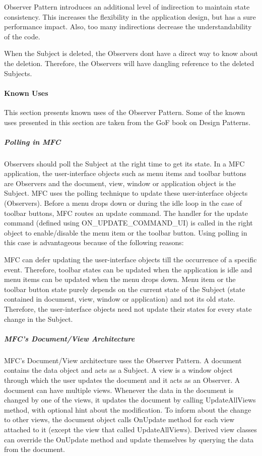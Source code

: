 \documentclass{book}
\begin{document}
    Observer Pattern introduces an additional level of indirection to maintain state consistency. This increases the flexibility in the application design, but has a sure performance impact.
    Also, too many indirections decrease the understandability of the code.

    When the Subject is deleted, the Observers dont have a direct way to know about the deletion. Therefore, the Observers will have dangling reference to the deleted Subjects.

\paragraph{Known Uses}

This section presents known uses of the Observer Pattern. Some of the known uses presented in this section are taken from the GoF book on Design Patterns.

\subparagraph{Polling in MFC}

Observers should poll the Subject at the right time to get its state. In a MFC application, the user-interface objects such as menu items and toolbar buttons are Observers and the document,
view, window or application object is the Subject. MFC uses the polling technique to update these user-interface objects (Observers).
Before a menu drops down or during the idle loop in the case of toolbar buttons, MFC routes an update command.
The handler for the update command (defined using ON\_UPDATE\_COMMAND\_UI) is called in the right object to enable/disable the menu item or the toolbar button.
Using polling in this case is advantageous because of the following reasons:

    MFC can defer updating the user-interface objects till the occurrence of a specific event.
    Therefore, toolbar states can be updated when the application is idle and menu items can be updated when the menu drops down.
    Menu item or the toolbar button state purely depends on the current state of the Subject (state contained in document, view, window or application) and not its old state.
    Therefore, the user-interface objects need not update their states for every state change in the Subject.

\subparagraph{MFC's Document/View Architecture}

MFC's Document/View architecture uses the Observer Pattern. A document contains the data object and acts as a Subject.
A view is a window object through which the user updates the document and it acts as an Observer.
A document can have multiple views. Whenever the data in the document is changed by one of the views,
it updates the document by calling UpdateAllViews method, with optional hint about the modification. To inform about the change to other views,
the document object calls OnUpdate method for each view attached to it (except the view that called UpdateAllViews).
Derived view classes can override the OnUpdate method and update themselves by querying the data from the document.
\end{document}
